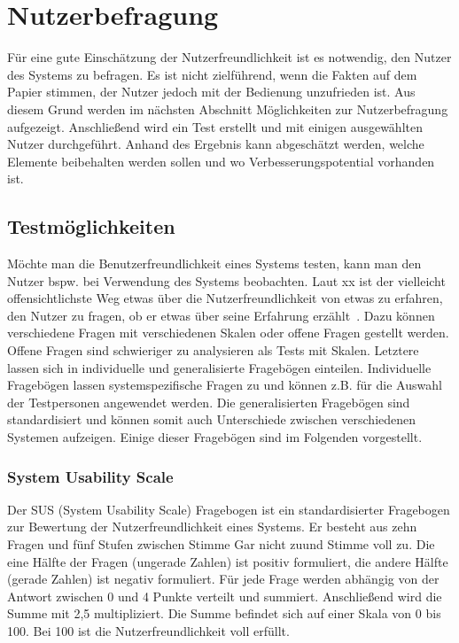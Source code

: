 \section{Nutzerbefragung}
\label{6:Nutzerbefragung}
Für eine gute Einschätzung der Nutzerfreundlichkeit ist es notwendig, den Nutzer des Systems zu befragen. Es ist nicht zielführend, wenn die Fakten auf dem Papier stimmen, der Nutzer jedoch mit der Bedienung unzufrieden ist. Aus diesem Grund werden im nächsten Abschnitt Möglichkeiten zur Nutzerbefragung aufgezeigt. Anschließend wird ein Test erstellt und mit einigen ausgewählten Nutzer durchgeführt. Anhand des Ergebnis kann abgeschätzt werden, welche Elemente beibehalten werden sollen und wo Verbesserungspotential vorhanden ist.

\subsection{Testmöglichkeiten}
Möchte man die Benutzerfreundlichkeit eines Systems testen, kann man den Nutzer bspw. bei Verwendung des Systems beobachten. Laut xx ist \glqq der vielleicht offensichtlichste Weg etwas über die Nutzerfreundlichkeit von etwas zu erfahren, den Nutzer zu fragen, ob er etwas über seine Erfahrung erzählt\grqq \ \citep[123]{Tullis2008}. Dazu können verschiedene Fragen mit verschiedenen Skalen oder offene Fragen gestellt werden. Offene Fragen sind schwieriger zu analysieren als Tests mit Skalen. Letztere lassen sich in individuelle und generalisierte Fragebögen einteilen. Individuelle Fragebögen lassen systemspezifische Fragen zu und können z.B. für die Auswahl der Testpersonen angewendet werden. Die generalisierten Fragebögen sind standardisiert und können somit auch Unterschiede zwischen verschiedenen Systemen aufzeigen. Einige dieser Fragebögen sind im Folgenden vorgestellt.

\subsubsection*{System Usability Scale}
Der SUS (System Usability Scale) Fragebogen ist ein standardisierter Fragebogen zur Bewertung der Nutzerfreundlichkeit eines Systems. Er besteht aus zehn Fragen und fünf Stufen zwischen \glqq Stimme Gar nicht zu\grqq und \glqq Stimme voll zu\grqq. Die eine Hälfte der Fragen (ungerade Zahlen) ist positiv formuliert, die andere Hälfte (gerade Zahlen) ist negativ formuliert. Für jede Frage werden abhängig von der Antwort zwischen 0 und 4 Punkte verteilt und summiert. Anschließend wird die Summe mit 2,5 multipliziert. Die Summe befindet sich auf einer Skala von 0 bis 100. Bei 100 ist die Nutzerfreundlichkeit voll erfüllt. 


